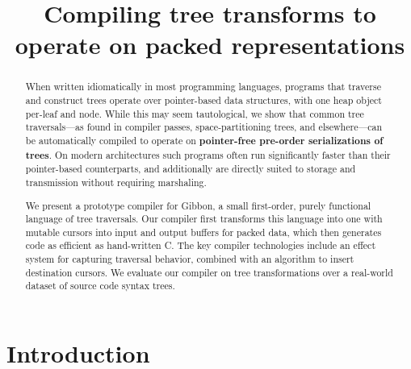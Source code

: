 \documentclass[a4paper,english]{lipics-v2016}
\title{Compiling tree transforms to operate on packed representations}
\author[1]{}
\begin{document}
\maketitle

\begin{abstract}
When written idiomatically in most programming languages, programs that traverse
and construct trees operate over pointer-based data structures, with one heap
object per-leaf and node.  While this may seem tautological, we show that common
tree traversals---as found in compiler passes, space-partitioning trees, and
elsewhere---can  be automatically compiled to operate on \textbf{pointer-free
pre-order serializations of trees}.  On modern architectures such programs
often run {significantly} faster than their pointer-based counterparts,
{and additionally are directly suited to storage and transmission without
  requiring marshaling.}

We present a prototype compiler for \textsf{Gibbon}, a small
first-order, purely functional language of tree traversals.  Our
compiler first transforms this language into one with
mutable cursors into input and output buffers
for packed data, which then generates code as efficient as
hand-written C. The key compiler technologies include an effect
system for capturing traversal behavior, combined with an
algorithm to insert destination cursors.
We evaluate our compiler on 
tree transformations over a real-world dataset of source code syntax trees.

\end{abstract}




\section{Introduction}

\end{document}
